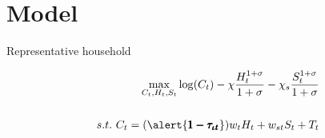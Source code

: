 \documentclass[11pt,aspectratio=169]{beamer}
\begin{document}
\section{Model}



\addtocounter{framenumber}{-1}




\begin{frame}{Representative household}
\hypertarget{backhh}{}
\vspace{2mm}
\begin{minipage}[t!]{1\textwidth}
	\begin{align*}
		\max_{C_t, H_{t}, S_{t}} \log(C_t)-\chi\frac{H_{t}^{1+\sigma}}{1+\sigma}-\chi_s\frac{S_{t}^{1+\sigma}}{1+\sigma}
		\\
		\vspace{4mm}
		\\
		s.t.\ C_t=(\alert{\pmb{1-\tau_{\iota t}}})w_{t}H_{t}+w_{st}S_t+T_t%
	\end{align*}
\end{minipage}


\end{frame}
\end{document}
